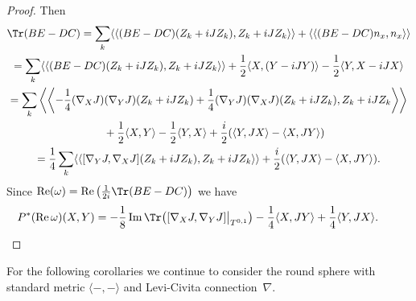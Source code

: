 \begin{proof}
Then
\begin{gather*}
\Tr(BE-DC) = \sum_k \langle\langle (BE-DC) (Z_k + i J Z_k), Z_k + i J Z_k \rangle\rangle + \langle\langle (BE-DC)n_x,n_x \rangle\rangle \\
=\sum_k \langle\langle (BE-DC)( Z_k + i J Z_k), Z_k + i J Z_k \rangle\rangle + \frac 1 2 \langle X , (Y - i J Y) \rangle - \frac 1 2 \langle Y , X-iJX \rangle \\
= \sum_k \left\langle\left\langle -\frac{1}{4} (\nabla_X J) (\nabla_Y J)(Z_k + i J Z_k) +
\frac{1}{4} (\nabla_Y J) (\nabla_X J)(Z_k + i J Z_k)
, Z_k + i J Z_k \right\rangle\right\rangle \\
\quad{} + \frac 1 2 \langle X , Y\rangle - \frac 1 2 \langle Y , X \rangle + \frac i 2 ( \langle Y , JX \rangle - \langle X , JY \rangle ) \\
= \frac{1}{4} \sum_k \langle\langle [ \nabla_Y J , \nabla_X J ] (Z_k + i J Z_k)
, Z_k + i J Z_k \rangle\rangle + \frac i 2 ( \langle Y , JX \rangle - \langle X , JY \rangle ) .
\end{gather*}
Since $\operatorname{Re}(\omega) = \operatorname{Re} \big( \frac{1}{2i} \Tr(BE-DC)\big)$ we have
\begin{gather*}
 P^* (\operatorname{Re} \omega ) (X,Y)
= -\frac{1}{8} \operatorname{Im} \Tr \big( [ \nabla_X J , \nabla_Y J ] \big|_{T^{0,1}} \big)
 - \frac 1 4 \langle X,JY \rangle + \frac 1 4 \langle Y,JX \rangle. \tag*{\qed}
 \end{gather*}\renewcommand{\qed}{}
\end{proof}

For the following corollaries we continue to consider the round sphere with standard metric $\langle - ,- \rangle$ and Levi-Civita connection~$\nabla$.

